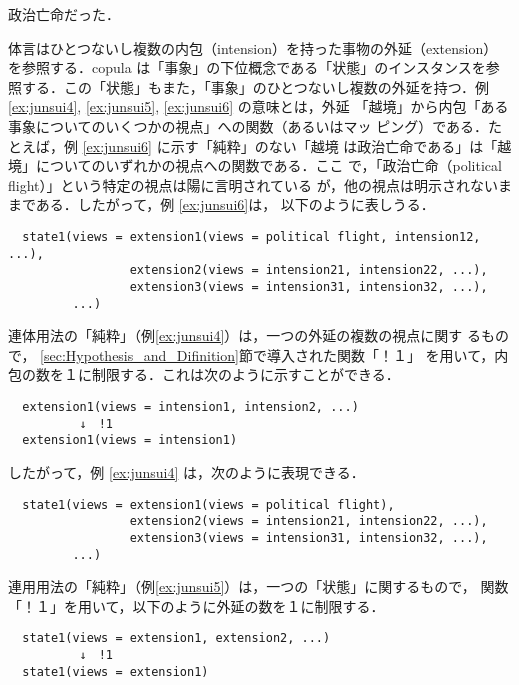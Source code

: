 \begin{exx}\rm
  \label{ex:junsui6}
  \hspace*{.5cm} 政治亡命だった．
\end{exx}

体言はひとつないし複数の内包（intension）を持った事物の外延（extension）
を参照する．copula は「事象」の下位概念である「状態」のインスタンスを参
照する．この「状態」もまた，「事象」のひとつないし複数の外延を持つ．例 
\ref{ex:junsui4}, \ref{ex:junsui5}, \ref{ex:junsui6} の意味とは，外延
「越境」から内包「ある事象についてのいくつかの視点」への関数（あるいはマッ
ピング）である．たとえば，例 \ref{ex:junsui6} に示す「純粋」のない「越境
は政治亡命である」は「越境」についてのいずれかの視点への関数である．ここ
で，「政治亡命（political flight）」という特定の視点は陽に言明されている
が，他の視点は明示されないままである．したがって，例 \ref{ex:junsui6}は，
以下のように表しうる．  

\begin{verbatim}
  state1(views = extension1(views = political flight, intension12, ...), 
                 extension2(views = intension21, intension22, ...), 
                 extension3(views = intension31, intension32, ...), 
         ...)
\end{verbatim}

連体用法の「純粋」（例\ref{ex:junsui4}）は，一つの外延の複数の視点に関す
るもので， \ref{sec:Hypothesis_and_Difinition}節で導入された関数「！１」
を用いて，内包の数を１に制限する．これは次のように示すことができる．
 
\begin{verbatim}
  extension1(views = intension1, intension2, ...)
          ↓　!1
  extension1(views = intension1)
\end{verbatim}

\noindent

したがって，例 \ref{ex:junsui4} は，次のように表現できる．

\begin{verbatim}
  state1(views = extension1(views = political flight), 
                 extension2(views = intension21, intension22, ...), 
                 extension3(views = intension31, intension32, ...), 
         ...)
\end{verbatim}

連用用法の「純粋」（例\ref{ex:junsui5}）は，一つの「状態」に関するもので，
関数「！１」を用いて，以下のように外延の数を１に制限する．

\begin{verbatim}
  state1(views = extension1, extension2, ...) 
          ↓　!1
  state1(views = extension1)
\end{verbatim}


